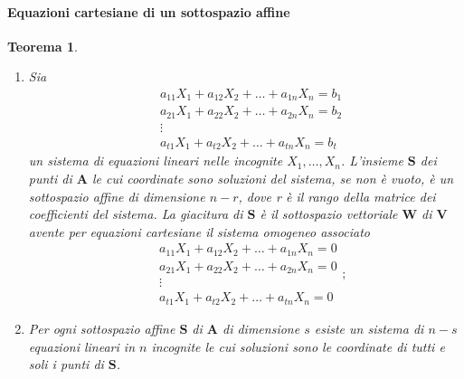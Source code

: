 \documentclass{article}
\theoremstyle{plain}
\newtheorem{thm}{Teorema}[section]
\theoremstyle{definition}
\theoremstyle{remark}
\begin{document}
\paragraph{Equazioni cartesiane di un sottospazio affine}
\begin{bxthm}
\begin{thm}\label{thma}
    \begin{enumerate}
        \item Sia 
        \begin{equation}\label{sistnormale}
            \begin{array}{rcl}
                &a_{11}X_1+a_{12}X_2+\ldots+a_{1n}X_n=b_1\\
                &a_{21}X_1+a_{22}X_2+\ldots+a_{2n}X_n=b_2\\
                & \vdots \\
                &a_{t1}X_1+a_{t2}X_2+\ldots+a_{tn}X_n=b_t
                \end{array}
        \end{equation}
        un sistema di equazioni lineari nelle incognite $X_1,\ldots,X_n$. L'insieme $\mathbf{S}$ dei punti di $\mathbf{A}$ le cui 
        coordinate sono soluzioni del sistema, se non è vuoto, è un sottospazio affine di dimensione $n-r$, dove r è il rango della matrice dei coefficienti del sistema.
        La giacitura di $\mathbf{S}$ è il sottospazio vettoriale $\mathbf{W}$ di $\mathbf{V}$ avente per equazioni cartesiane il sistema omogeneo associato
        \begin{equation}\label{sistomogeneo}
            \begin{array}{rcl}
                &a_{11}X_1+a_{12}X_2+\ldots+a_{1n}X_n=0\\
                &a_{21}X_1+a_{22}X_2+\ldots+a_{2n}X_n=0\\
                & \vdots \\
                &a_{t1}X_1+a_{t2}X_2+\ldots+a_{tn}X_n=0
                \end{array};
        \end{equation}
        \item Per ogni sottospazio affine $\mathbf{S}$ di $\mathbf{A}$ di dimensione $s$ esiste un sistema di $n-s$ equazioni 
        lineari in $n$ incognite le cui soluzioni sono le coordinate di tutti e soli i punti di $\mathbf{S}$.
    \end{enumerate}
\end{thm}
\end{bxthm}
\end{document}
